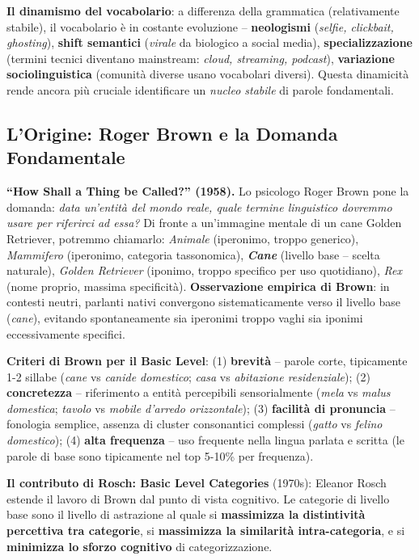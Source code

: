 \documentclass[12pt,a4paper]{article}
\begin{document}
\textbf{Il dinamismo del vocabolario}: a differenza della grammatica (relativamente stabile), il vocabolario \`e in costante evoluzione -- \textbf{neologismi} (\textit{selfie, clickbait, ghosting}), \textbf{shift semantici} (\textit{virale} da biologico a social media), \textbf{specializzazione} (termini tecnici diventano mainstream: \textit{cloud, streaming, podcast}), \textbf{variazione sociolinguistica} (comunit\`a diverse usano vocabolari diversi). Questa dinamicit\`a rende ancora pi\`u cruciale identificare un \emph{nucleo stabile} di parole fondamentali.

\subsection{L'Origine: Roger Brown e la Domanda Fondamentale}

\begin{defbox}
\textbf{``How Shall a Thing be Called?'' (1958).}
Lo psicologo Roger Brown pone la domanda: \emph{data un'entit\`a del mondo reale, quale termine linguistico dovremmo usare per riferirci ad essa?} Di fronte a un'immagine mentale di un cane Golden Retriever, potremmo chiamarlo: \textit{Animale} (iperonimo, troppo generico), \textit{Mammifero} (iperonimo, categoria tassonomica), \textbf{\textit{Cane}} (livello base -- scelta naturale), \textit{Golden Retriever} (iponimo, troppo specifico per uso quotidiano), \textit{Rex} (nome proprio, massima specificit\`a). \textbf{Osservazione empirica di Brown}: in contesti neutri, parlanti nativi convergono sistematicamente verso il livello base (\textit{cane}), evitando spontaneamente sia iperonimi troppo vaghi sia iponimi eccessivamente specifici.
\end{defbox}

\textbf{Criteri di Brown per il Basic Level}: (1) \textbf{brevit\`a} -- parole corte, tipicamente 1-2 sillabe (\textit{cane} vs \textit{canide domestico}; \textit{casa} vs \textit{abitazione residenziale}); (2) \textbf{concretezza} -- riferimento a entit\`a percepibili sensorialmente (\textit{mela} vs \textit{malus domestica}; \textit{tavolo} vs \textit{mobile d'arredo orizzontale}); (3) \textbf{facilit\`a di pronuncia} -- fonologia semplice, assenza di cluster consonantici complessi (\textit{gatto} vs \textit{felino domestico}); (4) \textbf{alta frequenza} -- uso frequente nella lingua parlata e scritta (le parole di base sono tipicamente nel top 5-10\% per frequenza).

\textbf{Il contributo di Rosch: Basic Level Categories} (1970s): Eleanor Rosch estende il lavoro di Brown dal punto di vista cognitivo. Le categorie di livello base sono il livello di astrazione al quale si \textbf{massimizza la distintivit\`a percettiva tra categorie}, si \textbf{massimizza la similarit\`a intra-categoria}, e si \textbf{minimizza lo sforzo cognitivo} di categorizzazione.
\end{document}
